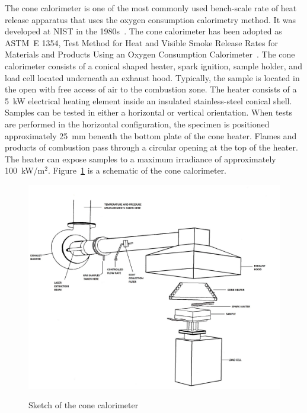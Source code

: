 \documentclass[twoside]{uocthesis}
\begin{document}
{The cone calorimeter is one of the most commonly used bench-scale rate of heat release apparatus that uses the oxygen consumption calorimetry method. It was developed at NIST in the 1980s~\cite{babrauskas:1984}. The cone calorimeter has been adopted as ASTM~E 1354, Test Method for Heat and Visible Smoke Release Rates for Materials and Products Using an Oxygen Consumption Calorimeter~\cite{ASTM_E1354}. The cone calorimeter consists of a conical shaped heater, spark ignition, sample holder, and load cell located underneath an exhaust hood. Typically, the sample is located in the open with free access of air to the combustion zone. The heater consists of a 5~kW electrical heating element inside an insulated stainless-steel conical shell. Samples can be tested in either a horizontal or vertical orientation. When tests are performed in the horizontal configuration, the specimen is positioned approximately 25~mm beneath the bottom plate of the cone heater. Flames and products of combustion pass through a circular opening at the top of the heater. The heater can expose samples to a maximum irradiance of approximately 100~kW/m$^2$. Figure~\ref{Cone_Cal} is a schematic of the cone calorimeter.

\begin{figure}
	\centering
	\includegraphics[width=\textwidth]{../Figures/Cone_Cal} \\
	\caption[Sketch of the cone calorimeter]{Sketch of the cone calorimeter~\cite{babrauskas:1984}}
	\label{Cone_Cal}
\end{figure}


}
\end{document}
